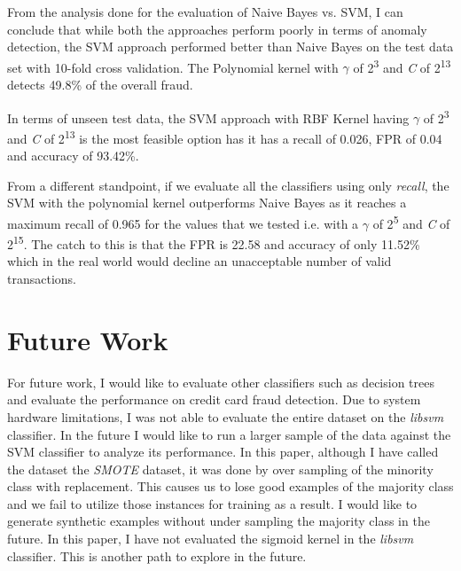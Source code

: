 \documentclass[conference]{IEEEtran}
\begin{document}
From the analysis done for the evaluation of Naive Bayes vs. SVM, I can conclude that while both the approaches perform poorly in terms of anomaly detection, the SVM approach performed better than Naive Bayes on the test data set with 10-fold cross validation. The Polynomial kernel with ${\gamma}$ of 2\textsuperscript{3} and \textit{C} of 2\textsuperscript{13} detects 49.8\% of the overall fraud.

In terms of unseen test data, the SVM approach with RBF Kernel having ${\gamma}$ of 2\textsuperscript{3} and \textit{C} of 2\textsuperscript{13} is the most feasible option has it has a recall of 0.026, FPR of 0.04 and accuracy of 93.42\%.

From a different standpoint, if we evaluate all the classifiers using only \textit{recall}, the SVM with the polynomial kernel outperforms Naive Bayes as it reaches a maximum recall of 0.965 for the values that we tested i.e. with a ${\gamma}$ of 2\textsuperscript{5} and \textit{C} of 2\textsuperscript{15}. The catch to this is that the FPR is 22.58 and accuracy of only 11.52\% which in the real world would decline an unacceptable number of valid transactions.



\section{Future Work}
For future work, I would like to evaluate other classifiers such as decision trees and evaluate the performance on credit card fraud detection. Due to system hardware limitations, I was not able to evaluate the entire dataset on the \textit{libsvm} classifier. In the future I would like to run a larger sample of the data against the SVM classifier to analyze its performance. In this paper, although I have called the dataset the \textit{SMOTE} dataset, it was done by over sampling of the minority class with replacement. This causes us to lose good examples of the majority class and we fail to utilize those instances for training as a result. I would like to generate synthetic examples without under sampling the majority class in the future. In this paper, I have not evaluated the sigmoid kernel in the \textit{libsvm} classifier. This is another path to explore in the future.



\end{document}
